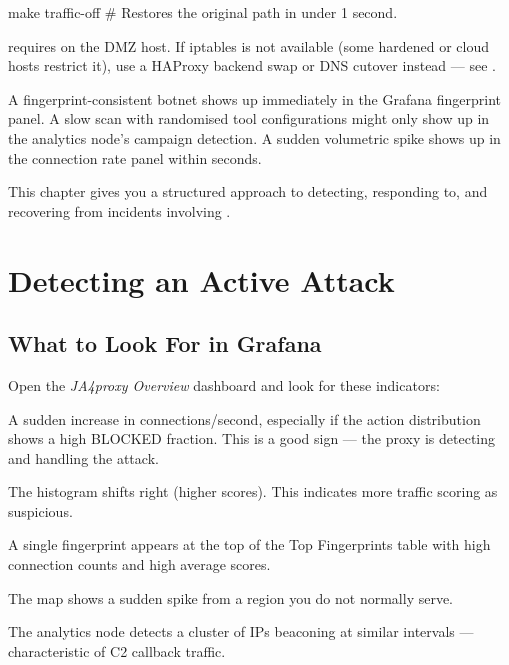 \begin{bashcode}
make traffic-off
# Restores the original path in under 1 second.
\end{bashcode}

\begin{notebox}
 requires  on the DMZ host. If
iptables is not available (some hardened or cloud hosts restrict it), use a
HAProxy backend swap or DNS cutover instead — see
.
\end{notebox}

A fingerprint-consistent botnet shows up immediately in the Grafana fingerprint
panel. A slow scan with randomised tool configurations might only show up in the
analytics node's campaign detection. A sudden volumetric spike shows up in the
connection rate panel within seconds.

This chapter gives you a structured approach to detecting, responding to, and
recovering from incidents involving \ja.

\section{Detecting an Active Attack}

\subsection{What to Look For in Grafana}

Open the \emph{JA4proxy Overview} dashboard and look for these indicators:

\begin{description}[leftmargin=4.5cm]
  \item[Connection rate spike] A sudden increase in connections/second, especially
    if the action distribution shows a high BLOCKED fraction. This is a good sign
    — the proxy is detecting and handling the attack.

  \item[Risk score distribution shift] The histogram shifts right (higher scores).
    This indicates more traffic scoring as suspicious.

  \item[New dominant fingerprint] A single fingerprint appears at the top of the
    Top Fingerprints table with high connection counts and high average scores.

  \item[Geographic concentration] The map shows a sudden spike from a region
    you do not normally serve.

  \item[Beaconing spikes] The analytics node detects a cluster of IPs beaconing
    at similar intervals — characteristic of C2 callback traffic.
\end{description}

